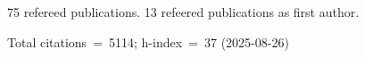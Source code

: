 75 refereed publications. 13 refeered publications as first author.

Total citations~=~5114; h-index~=~37 (2025-08-26)